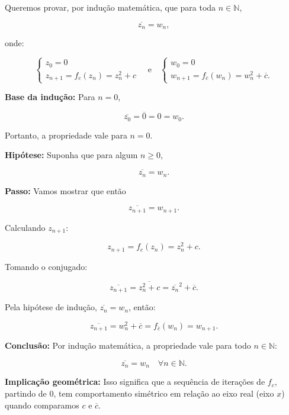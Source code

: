 \begin{enumerate}[label=(\alph*)]
        Queremos provar, por indução matemática, que para toda \( n \in \mathbb{N} \),

        \[
        \overline{z_n} = w_n,
        \]

        onde:

        \[
        \begin{cases}
        z_0 = 0 \\
        z_{n+1} = f_c(z_n) = z_n^2 + c
        \end{cases}
        \quad \text{e} \quad
        \begin{cases}
        w_0 = 0 \\
        w_{n+1} = f_{\overline{c}}(w_n) = w_n^2 + \overline{c}.
        \end{cases}
        \]

        \textbf{Base da indução:} Para \( n = 0 \),

        \[
        \overline{z_0} = \overline{0} = 0 = w_0.
        \]

        Portanto, a propriedade vale para \( n = 0 \).

        \textbf{Hipótese:} Suponha que para algum \( n \geq 0 \),

        \[
        \overline{z_n} = w_n.
        \]

        \textbf{Passo:} Vamos mostrar que então

        \[
        \overline{z_{n+1}} = w_{n+1}.
        \]

        Calculando \( z_{n+1} \):

        \[
        z_{n+1} = f_c(z_n) = z_n^2 + c.
        \]

        Tomando o conjugado:

        \[
        \overline{z_{n+1}} = \overline{z_n^2 + c} = \overline{z_n}^2 + \overline{c}.
        \]

        Pela hipótese de indução, \( \overline{z_n} = w_n \), então:

        \[
        \overline{z_{n+1}} = w_n^2 + \overline{c} = f_{\overline{c}}(w_n) = w_{n+1}.
        \]

        \textbf{Conclusão:} Por indução matemática, a propriedade vale para todo \( n \in \mathbb{N} \):

        \[
        \overline{z_n} = w_n \quad \forall n \in \mathbb{N}.
        \]

        \bigskip

        \textbf{Implicação geométrica:} Isso significa que a sequência de iterações de \( f_c \), partindo de \( 0 \), tem comportamento simétrico em relação ao eixo real (eixo \( x \)) quando comparamos \( c \) e \( \overline{c} \).


\end{enumerate}
